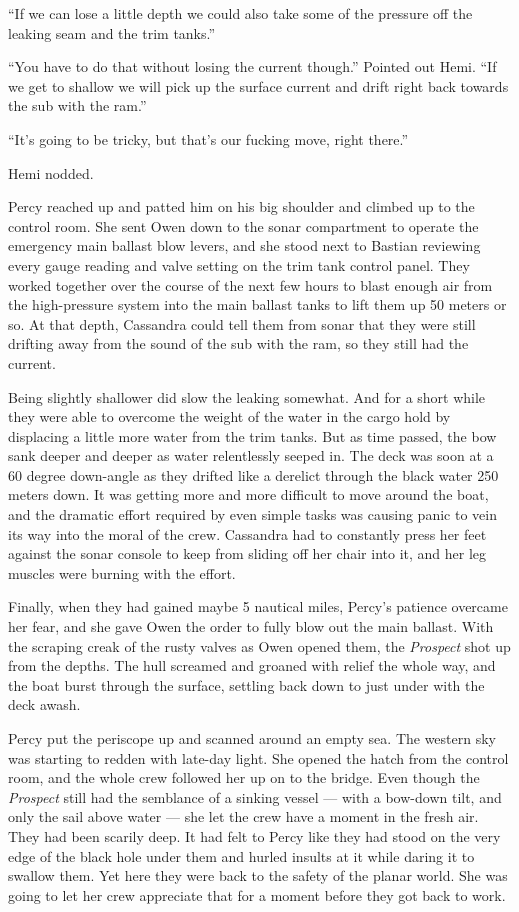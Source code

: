 \documentclass[
]{scrbook}
\begin{document}
``If we can lose a little depth we could also take some of the pressure
off the leaking seam and the trim tanks.''

``You have to do that without losing the current though.'' Pointed out
Hemi. ``If we get to shallow we will pick up the surface current and
drift right back towards the sub with the ram.''

``It's going to be tricky, but that's our fucking move, right there.''

Hemi nodded.

Percy reached up and patted him on his big shoulder and climbed up to
the control room. She sent Owen down to the sonar compartment to operate
the emergency main ballast blow levers, and she stood next to Bastian
reviewing every gauge reading and valve setting on the trim tank control
panel. They worked together over the course of the next few hours to
blast enough air from the high-pressure system into the main ballast
tanks to lift them up 50 meters or so. At that depth, Cassandra could
tell them from sonar that they were still drifting away from the sound
of the sub with the ram, so they still had the current.

Being slightly shallower did slow the leaking somewhat. And for a short
while they were able to overcome the weight of the water in the cargo
hold by displacing a little more water from the trim tanks. But as time
passed, the bow sank deeper and deeper as water relentlessly seeped in.
The deck was soon at a 60 degree down-angle as they drifted like a
derelict through the black water 250 meters down. It was getting more
and more difficult to move around the boat, and the dramatic effort
required by even simple tasks was causing panic to vein its way into the
moral of the crew. Cassandra had to constantly press her feet against
the sonar console to keep from sliding off her chair into it, and her
leg muscles were burning with the effort.

Finally, when they had gained maybe 5 nautical miles, Percy's patience
overcame her fear, and she gave Owen the order to fully blow out the
main ballast. With the scraping creak of the rusty valves as Owen opened
them, the \emph{Prospect} shot up from the depths. The hull screamed and
groaned with relief the whole way, and the boat burst through the
surface, settling back down to just under with the deck awash.

Percy put the periscope up and scanned around an empty sea. The western
sky was starting to redden with late-day light. She opened the hatch
from the control room, and the whole crew followed her up on to the
bridge. Even though the \emph{Prospect} still had the semblance of a
sinking vessel --- with a bow-down tilt, and only the sail above water
--- she let the crew have a moment in the fresh air. They had been
scarily deep. It had felt to Percy like they had stood on the very edge
of the black hole under them and hurled insults at it while daring it to
swallow them. Yet here they were back to the safety of the planar world.
She was going to let her crew appreciate that for a moment before they
got back to work.
\end{document}
